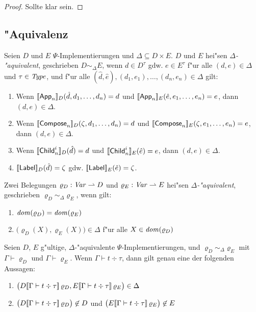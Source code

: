 \documentclass[%
  12pt,%
  a4paper,%
]{article}
\newcommand{\Tj}[3]{{#1}\vdash{#2}\div{#3}}
\begin{document}
\begin{proof}
  Sollte klar sein.
\end{proof}

\subsection*{"Aquivalenz}

\begin{definition} \label{def:Aequivalenz_von_Implementierungen}
  Seien $D$ und $E$ $\Psi$-Implementierungen und $\Delta \subseteq D \times E$. $D$ und $E$ hei"sen
  \emph{$\Delta$-"aquivalent}, geschrieben $D \sim_\Delta E$, wenn $d \in D^\tau$ gdw. $e \in E^\tau$
  f"ur alle $(d,e) \in \Delta$ und $\tau \in \mathit{Type}$,
  und f"ur alle $(\hat{d},\hat{e}),(d_1,e_1),\ldots,(d_n,e_n) \in \Delta$ gilt:
  \begin{enumerate}
  \item Wenn $[\![\mathsf{App}_n]\!]_D(\hat{d},d_1,\ldots,d_n) = d$ und $[\![\mathsf{App}_n]\!]_E(\hat{e},e_1,\ldots,e_n) = e$,
    dann $(d,e) \in \Delta$.
  \item Wenn $[\![\mathsf{Compose}_n]\!]_D(\zeta,d_1,\ldots,d_n) = d$ und $[\![\mathsf{Compose}_n]\!]_E(\zeta,e_1,\ldots,e_n) = e$,
    dann $(d,e) \in \Delta$.
  \item Wenn $[\![\mathsf{Child}_n^i]\!]_D(\hat{d}) = d$ und $[\![\mathsf{Child}_n^i]\!]_E(\hat{e}) = e$,
    dann $(d,e) \in \Delta$.
  \item $[\![\mathsf{Label}]\!]_D(\hat{d}) = \zeta$ gdw. $[\![\mathsf{Label}]\!]_E(\hat{e}) = \zeta$.
  \end{enumerate}
\end{definition}
Zwei Belegungen $\varrho_D: \mathit{Var} \rightharpoonup D$ und $\varrho_E: \mathit{Var} \rightharpoonup E$ hei"sen \emph{$\Delta$-"aquivalent},
geschrieben $\varrho_D \sim_\Delta \varrho_E$, wenn gilt:
\begin{enumerate}
\item $\mathit{dom}(\varrho_D) = \mathit{dom}(\varrho_E)$
\item $\bigl(\varrho_D(X),\varrho_E(X)\bigr) \in \Delta$ f"ur alle $X \in \mathit{dom}(\varrho_D)$
\end{enumerate}

\begin{lemma} \label{lem:Aequivalenz_von_Termen}
  Seien $D$, $E$ g"ultige, $\Delta$-"aquivalente $\Psi$-Implementierungen,
  und $\varrho_D \sim_\Delta \varrho_E$ mit $\Gamma \vdash \varrho_D$ und $\Gamma \vdash \varrho_E$.
  Wenn $\Tj{\Gamma}{t}{\tau}$, dann gilt genau eine der folgenden Aussagen:
  \begin{enumerate}
  \item
    $\bigl( D\sem{\Tj{\Gamma}{t}{\tau}}\,\varrho_D, E\sem{\Tj{\Gamma}{t}{\tau}}\,\varrho_E \bigr) \in \Delta$
  \item
    $\bigl( D\sem{\Tj{\Gamma}{t}{\tau}}\,\varrho_D \bigr) \not\in D$
    und $\bigl( E\sem{\Tj{\Gamma}{t}{\tau}}\,\varrho_E \bigr) \not\in E$
  \end{enumerate}
\end{lemma}
\end{document}
